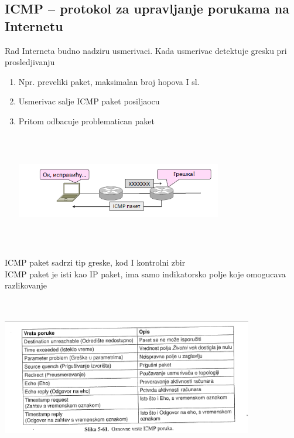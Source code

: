 \documentclass{article} %
\begin{document}
\subsection{ICMP – protokol za upravljanje porukama na Internetu}
Rad Interneta budno nadziru usmerivaci. Kada usmerivac detektuje gresku pri prosledjivanju
\begin{enumerate}
	\item Npr. preveliki paket,  maksimalan broj hopova I sl.
	\item Usmerivac salje ICMP paket posiljaocu
	\item Pritom odbacuje problematican paket 
	\begin{center}
		\includegraphics[width=9cm, height=5cm]{icmp}\\
	\end{center}
\end{enumerate}
ICMP paket sadrzi tip greske, kod I kontrolni zbir\\
ICMP paket je isti kao IP paket, ima samo indikatorsko polje koje omogucava razlikovanje
\begin{center}
	\includegraphics[width=11cm, height=7cm]{poruke}\\
\end{center}
\end{document}
